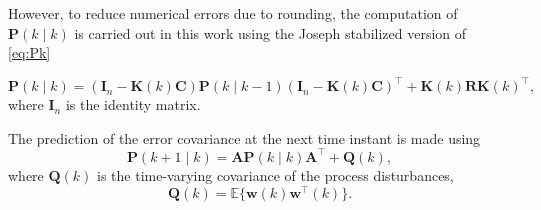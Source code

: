 {However, to reduce numerical errors due to rounding, the computation of $\mathbf{P}(k \mid k)$ is carried out in this work using the Joseph stabilized version of \eqref{eq:Pk} {\citep{lewis_optimal_2008}
 \begin{equation} \label{eq:Pk-stab}
 	\mathbf{P}(k \mid k) = \left( \mathbf{I}_n - \mathbf{K}(k) \mathbf{C} \right ) \mathbf{P}(k \mid k-1) \left( \mathbf{I}_n - \mathbf{K}(k) \mathbf{C} \right )^\intercal + \mathbf{K}(k)  \mathbf{R} \mathbf{K}(k)^\intercal,
 \end{equation}
%
where $\mathbf{I}_n$ is the identity matrix.

The prediction of the error covariance at the next time instant is made using
%
\begin{equation} \label{eq:Pkp1}
	\mathbf{P}(k+1 \mid k) = \mathbf{A} \mathbf{P}(k \mid k)  \mathbf{A}^\intercal  + \mathbf{Q}(k),
\end{equation}
where $\mathbf{Q}(k)$ is the time-varying covariance of the process disturbances,
%
\begin{equation} \label{eq:Q}
	\mathbf{Q}(k) = \mathbb{E}\{ \mathbf{w}(k) \mathbf{w}^\intercal(k) \}.
\end{equation}

}}
